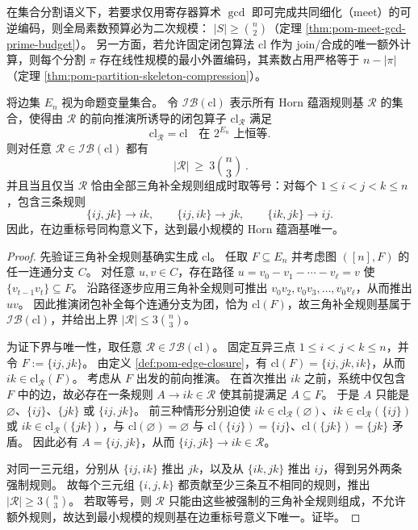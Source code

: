 \begin{corollary}[二次—线性预算对偶律]\label{cor:pom-partition-budget-duality}
在集合分割语义下，若要求仅用寄存器算术 \(\gcd\) 即可完成共同细化（meet）的可逆编码，则全局素数预算必为二次规模：
\(|S|\ge \binom{n}{2}\)（定理 \ref{thm:pom-meet-gcd-prime-budget}）。
另一方面，若允许固定闭包算法 \(\mathrm{cl}\) 作为 join/合成的唯一额外计算，则每个分割 \(\pi\) 存在线性规模的最小外置编码，其素数占用严格等于 \(n-|\pi|\)（定理 \ref{thm:pom-partition-skeleton-compression}）。
\end{corollary}

\begin{theorem}\label{thm:pom-eq-closure-horn-binary-min}
将边集 \(E_n\) 视为命题变量集合。
令 \(\mathcal{IB}(\mathrm{cl})\) 表示所有 Horn 蕴涵规则基 \(\mathcal{R}\) 的集合，使得由 \(\mathcal{R}\) 的前向推演所诱导的闭包算子 \(\mathrm{cl}_{\mathcal{R}}\) 满足
\[
\mathrm{cl}_{\mathcal{R}}=\mathrm{cl}\quad\text{在 }2^{E_n}\text{ 上恒等}.
\]
则对任意 \(\mathcal{R}\in\mathcal{IB}(\mathrm{cl})\) 都有
\[
\boxed{\ |\mathcal{R}|\ \ge\ 3\binom{n}{3}\ }.
\]
并且当且仅当 \(\mathcal{R}\) 恰由全部三角补全规则组成时取等号：对每个 \(1\le i<j<k\le n\)，包含三条规则
\[
\{ij,jk\}\to ik,\qquad
\{ij,ik\}\to jk,\qquad
\{ik,jk\}\to ij.
\]
因此，在边重标号同构意义下，达到最小规模的 Horn 蕴涵基唯一。
\end{theorem}
\begin{proof}
先验证三角补全规则基确实生成 \(\mathrm{cl}\)。
任取 \(F\subseteq E_n\) 并考虑图 \(([n],F)\) 的任一连通分支 \(C\)。
对任意 \(u,v\in C\)，存在路径 \(u=v_0-v_1-\cdots-v_\ell=v\) 使 \(\{v_{t-1}v_t\}\subseteq F\)。
沿路径逐步应用三角补全规则可推出 \(v_0v_2,v_0v_3,\dots,v_0v_\ell\)，从而推出 \(uv\)。
因此推演闭包补全每个连通分支为团，恰为 \(\mathrm{cl}(F)\)，故三角补全规则基属于 \(\mathcal{IB}(\mathrm{cl})\)，并给出上界 \(|\mathcal{R}|\le 3\binom{n}{3}\)。
\par
为证下界与唯一性，取任意 \(\mathcal{R}\in\mathcal{IB}(\mathrm{cl})\)。
固定互异三点 \(1\le i<j<k\le n\)，并令
\(
F:=\{ij,jk\}
\)。
由定义 \ref{def:pom-edge-closure}，有
\(
\mathrm{cl}(F)=\{ij,jk,ik\}
\)，从而 \(ik\in \mathrm{cl}_{\mathcal{R}}(F)\)。
考虑从 \(F\) 出发的前向推演。
在首次推出 \(ik\) 之前，系统中仅包含 \(F\) 中的边，故必存在一条规则 \(A\to ik\in\mathcal{R}\) 使其前提满足 \(A\subseteq F\)。
于是 \(A\) 只能是 \(\varnothing\)、\(\{ij\}\)、\(\{jk\}\) 或 \(\{ij,jk\}\)。
前三种情形分别迫使 \(ik\in \mathrm{cl}_{\mathcal{R}}(\varnothing)\)、\(ik\in \mathrm{cl}_{\mathcal{R}}(\{ij\})\) 或 \(ik\in \mathrm{cl}_{\mathcal{R}}(\{jk\})\)，与
\(\mathrm{cl}(\varnothing)=\varnothing\) 与 \(\mathrm{cl}(\{ij\})=\{ij\}\)、\(\mathrm{cl}(\{jk\})=\{jk\}\) 矛盾。
因此必有 \(A=\{ij,jk\}\)，从而 \(\{ij,jk\}\to ik\in\mathcal{R}\)。
\par
对同一三元组，分别从 \(\{ij,ik\}\) 推出 \(jk\)，以及从 \(\{ik,jk\}\) 推出 \(ij\)，得到另外两条强制规则。
故每个三元组 \(\{i,j,k\}\) 都贡献至少三条互不相同的规则，推出 \(|\mathcal{R}|\ge 3\binom{n}{3}\)。
若取等号，则 \(\mathcal{R}\) 只能由这些被强制的三角补全规则组成，不允许额外规则，故达到最小规模的规则基在边重标号意义下唯一。证毕。
\end{proof}

